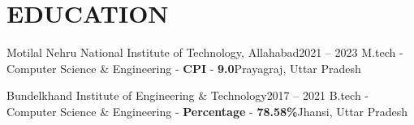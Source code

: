\section{EDUCATION} {
    \resumeSubHeadingListStart
        \resumeSubheading
            {Motilal Nehru National Institute of Technology, Allahabad}{2021 -- 2023}
            {M.tech - Computer Science \& Engineering - \textbf{CPI} - \textbf{9.0}}{Prayagraj, Uttar Pradesh}
    \resumeSubHeadingListEnd

    \vspace{-10pt}
    \resumeSubHeadingListStart
        \resumeSubheading
            {Bundelkhand Institute of Engineering \& Technology}{2017 -- 2021}
            {B.tech - Computer Science \& Engineering  - \textbf{Percentage} - \textbf{78.58\%}}{Jhansi, Uttar Pradesh}
    \resumeSubHeadingListEnd
    
    
}